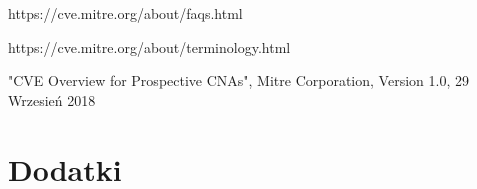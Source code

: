 \documentclass[a4paper,12pt,twoside]{article}
\begin{document}
\newpage
\thispagestyle{empty}
\mbox{}

\newpage
\section*{ }

\renewcommand{\refname}{Bibliografia}
\begin{thebibliography}{}


https://cve.mitre.org/about/faqs.html

https://cve.mitre.org/about/terminology.html

"CVE Overview for Prospective CNAs", Mitre Corporation, Version 1.0, 29 Wrzesień 2018

  

\end{thebibliography}

\newpage
\section*{ }
\listoffigures
\newpage
{}

\newpage
\section*{ }
\listoftables
\newpage
{}

\newpage
\section*{ }
\renewcommand{\lstlistlistingname}{Spis listingów}
\lstlistoflistings 
\newpage
{}



\newpage
\section*{Dodatki}
\paragraph{}
\end{document}
